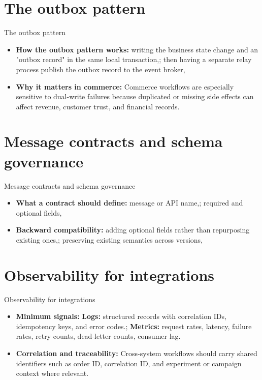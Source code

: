 \documentclass[aspectratio=169]{beamer}
\begin{document}
\section{The outbox pattern}

\begin{frame}{The outbox pattern}
  \begin{itemize}
    \item \textbf{How the outbox pattern works:} writing the business state change and an "outbox record" in the same local transaction,; then having a separate relay process publish the outbox record to the event broker,
    \item \textbf{Why it matters in commerce:} Commerce workflows are especially sensitive to dual-write failures because duplicated or missing side effects can affect revenue, customer trust, and financial records.
  \end{itemize}
\end{frame}

\section{Message contracts and schema governance}

\begin{frame}{Message contracts and schema governance}
  \begin{itemize}
    \item \textbf{What a contract should define:} message or API name,; required and optional fields,
    \item \textbf{Backward compatibility:} adding optional fields rather than repurposing existing ones,; preserving existing semantics across versions,
  \end{itemize}
\end{frame}

\section{Observability for integrations}

\begin{frame}{Observability for integrations}
  \begin{itemize}
    \item \textbf{Minimum signals:} \textbf{Logs:} structured records with correlation IDs, idempotency keys, and error codes.; \textbf{Metrics:} request rates, latency, failure rates, retry counts, dead-letter counts, consumer lag.
    \item \textbf{Correlation and traceability:} Cross-system workflows should carry shared identifiers such as order ID, correlation ID, and experiment or campaign context where relevant.
  \end{itemize}
\end{frame}
\end{document}
